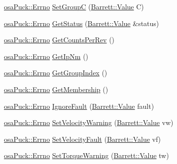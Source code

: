 \begin{DoxyCompactItemize}
\hyperlink{classosa_puck_af19c88d20083577d3a676353b4902391}{osa\+Puck\+::\+Errno} \hyperlink{classosa_puck_aed77aa5ecd5457a40cf0ccb3d2824a24}{Set\+Group\+C} (\hyperlink{struct_barrett_a57ff132885344ca62e4b4b691885685b}{Barrett\+::\+Value} C)
\item 
\hyperlink{classosa_puck_af19c88d20083577d3a676353b4902391}{osa\+Puck\+::\+Errno} \hyperlink{classosa_puck_a0446abb0c8bd038b8b496b1f02382228}{Get\+Status} (\hyperlink{struct_barrett_a57ff132885344ca62e4b4b691885685b}{Barrett\+::\+Value} \&status)
\item 
\hyperlink{classosa_puck_af19c88d20083577d3a676353b4902391}{osa\+Puck\+::\+Errno} \hyperlink{classosa_puck_a0908a1d52a613fcbbb618bdfb4d5df3a}{Get\+Counts\+Per\+Rev} ()
\item 
\hyperlink{classosa_puck_af19c88d20083577d3a676353b4902391}{osa\+Puck\+::\+Errno} \hyperlink{classosa_puck_abf8a7cea87cd6c9abaa0824363bf9b09}{Get\+Ip\+Nm} ()
\item 
\hyperlink{classosa_puck_af19c88d20083577d3a676353b4902391}{osa\+Puck\+::\+Errno} \hyperlink{classosa_puck_a3819526af24bd0f59b87dba646582182}{Get\+Group\+Index} ()
\item 
\hyperlink{classosa_puck_af19c88d20083577d3a676353b4902391}{osa\+Puck\+::\+Errno} \hyperlink{classosa_puck_aff66b18a4130053888198421bfd1b09c}{Get\+Membership} ()
\item 
\hyperlink{classosa_puck_af19c88d20083577d3a676353b4902391}{osa\+Puck\+::\+Errno} \hyperlink{classosa_puck_a4e084f70855cf653e18625d969219609}{Ignore\+Fault} (\hyperlink{struct_barrett_a57ff132885344ca62e4b4b691885685b}{Barrett\+::\+Value} fault)
\item 
\hyperlink{classosa_puck_af19c88d20083577d3a676353b4902391}{osa\+Puck\+::\+Errno} \hyperlink{classosa_puck_a8eb0fa1e2bbfbbc6d5367de197f55073}{Set\+Velocity\+Warning} (\hyperlink{struct_barrett_a57ff132885344ca62e4b4b691885685b}{Barrett\+::\+Value} vw)
\item 
\hyperlink{classosa_puck_af19c88d20083577d3a676353b4902391}{osa\+Puck\+::\+Errno} \hyperlink{classosa_puck_a709f07a317629af72d819cdb7f182f30}{Set\+Velocity\+Fault} (\hyperlink{struct_barrett_a57ff132885344ca62e4b4b691885685b}{Barrett\+::\+Value} vf)
\item 
\hyperlink{classosa_puck_af19c88d20083577d3a676353b4902391}{osa\+Puck\+::\+Errno} \hyperlink{classosa_puck_a475a911fe2e8d62a3ec598bdf8bd205f}{Set\+Torque\+Warning} (\hyperlink{struct_barrett_a57ff132885344ca62e4b4b691885685b}{Barrett\+::\+Value} tw)
\item 

\end{DoxyCompactItemize}
